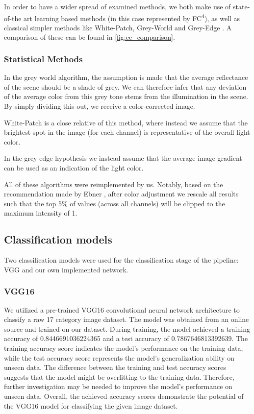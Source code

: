 In order to have a wider spread of examined methods, we both make use of state-of-the art 
learning based methods (in this case represented by FC\textsuperscript{4}\cite{hu2017fc}), as well as classical simpler methods 
like White-Patch, Grey-World \cite{EbnerConstancy} and Grey-Edge \cite{van2005color}.
A comparison of these can be found in \ref{fig:cc_comparison}.

\subsubsection{Statistical Methods}

In the grey world algorithm, the assumption is made that the average reflectance of the scene should
be a shade of grey. We can therefore infer that any deviation of the average color from this grey tone stems from
the illumination in the scene. By simply dividing this out, we receive a color-corrected image.

White-Patch is a close relative of this method, where instead we assume that the brightest spot in the image (for each channel)
is representative of the overall light color.

In the grey-edge hypothesis we instead assume that the average image gradient can be used as an indication of the light color.

All of these algorithms were reimplemented by us. Notably, based on the recommendation made by Ebner \cite{EbnerConstancy},
after color adjustment we rescale all results such that the top 5\% of values (across all channels) will be clipped to
the maximum intensity of 1.

\subsection{Classification models}

Two classification models were used for the classification stage of the pipeline: VGG and our own implemented network. %

\subsubsection{VGG16}
We utilized a pre-trained VGG16 convolutional neural network architecture to classify a raw 17 category image dataset. 
The model was obtained from an online source and trained on our dataset. During training, the model achieved a training accuracy of 0.8446691036224365 and a test accuracy of 0.7867646813392639. 
The training accuracy score indicates the model's performance on the training data, while the test accuracy score represents the model's generalization ability on unseen data. 
The difference between the training and test accuracy scores suggests that the model might be overfitting to the training data. Therefore, further investigation may be needed to improve the model's performance on unseen data.
Overall, the achieved accuracy scores demonstrate the potential of the VGG16 model for classifying the given image dataset. 

